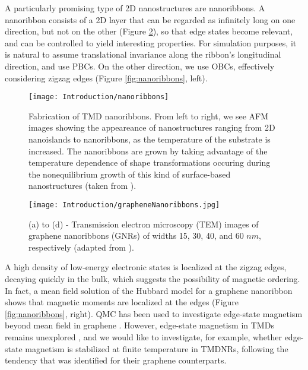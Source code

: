 A particularly promising type of \acs{2D}  nanostructures are nanoribbons.
A nanoribbon consists of a \ac{2D} layer that can be regarded as infinitely long on one direction, but not on the other (Figure \ref{fig:fabrication}), so that edge states become relevant, and can be controlled to yield interesting properties.
For simulation purposes, it is natural to assume translational invariance along the ribbon's longitudinal direction, and use \acp{PBC}.
On the other direction, we use \acp{OBC}, effectively considering zigzag edges (Figure \ref{fig:nanoribbons}, left).

\begin{figure}[H]
\centering
\texttt{[image: Introduction/nanoribbons]}
\caption[Fabrication of \ac{TMD} nanoribbons]{Fabrication of \ac{TMD} nanoribbons. From left to right, we see \ac{AFM} images showing the appeareance of nanostructures ranging from \ac{2D} nanoislands to nanoribbons, as the temperature of the substrate is increased. The nanoribbons are grown by taking advantage of the temperature dependence of shape transformations occuring during the nonequilibrium growth of this kind of surface-based nanostructures (taken from \cite{chen_fabrication_2017}).}
\label{fig:fabrication}
\end{figure}

\begin{figure}[H]
\vspace{-1cm}
\centering
\texttt{[image: Introduction/grapheneNanoribbons.jpg]}
\caption[(TEM) images of graphene nanoribbons.]{(a) to (d) - Transmission electron microscopy (TEM) images of graphene nanoribbons (GNRs) of widths 15, 30, 40, and 60 $nm$, respectively (adapted from \cite{mohanty_nanotomy-based_2012}).}
\label{fig:fabrication}
\end{figure}
   
A high density of low-energy electronic states is localized at the zigzag edges, decaying quickly in the bulk, which suggests the possibility of magnetic ordering.
In fact, a mean field solution of the Hubbard model for a graphene nanoribbon shows that magnetic moments are localized at the edges \cite{yazyev_emergence_2010} (Figure \ref{fig:nanoribbons}, right).
QMC has been used to investigate edge-state magnetism beyond mean field in graphene \cite{feldner_dynamical_2011, golor_quantum_2013, cheng_strain-induced_2015, raczkowski_interplay_2017, yang_strain-tuning_2017}.
However, edge-state magnetism in \acp{TMD} remains unexplored \cite{davelou_nanoribbon_2017}, and we would like to investigate, for example, whether edge-state magnetism is stabilized at finite temperature in \acp{TMDNR}, following the tendency that was identified for their graphene counterparts.
 
